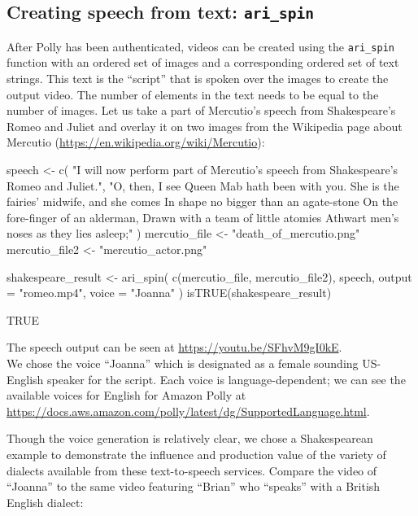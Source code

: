 \hypertarget{creating-speech-from-text-ari_spin}{%
\subsection{\texorpdfstring{Creating speech from text:
\texttt{ari\_spin}}{Creating speech from text: ari\_spin}}\label{creating-speech-from-text-ari_spin}}

After Polly has been authenticated, videos can be created using the
\texttt{ari\_spin} function with an ordered set of images and a
corresponding ordered set of text strings. This text is the ``script''
that is spoken over the images to create the output video. The number of
elements in the text needs to be equal to the number of images. Let us
take a part of Mercutio's speech from Shakespeare's Romeo and Juliet
\citep{shakespeare2003romeo} and overlay it on two images from the
Wikipedia page about Mercutio
(\url{https://en.wikipedia.org/wiki/Mercutio}):

\begin{example}
speech <- c(
  "I will now perform part of Mercutio's speech from Shakespeare's Romeo and Juliet.",
  "O, then, I see Queen Mab hath been with you.
   She is the fairies' midwife, and she comes
   In shape no bigger than an agate-stone
   On the fore-finger of an alderman,
   Drawn with a team of little atomies
   Athwart men's noses as they lies asleep;"
)
mercutio_file <- "death_of_mercutio.png"
mercutio_file2 <- "mercutio_actor.png"
\end{example}

\begin{example}
shakespeare_result <- ari_spin(
  c(mercutio_file, mercutio_file2),
  speech,
  output = "romeo.mp4", voice = "Joanna"
)
isTRUE(shakespeare_result)
\end{example}

\begin{example}
[1] TRUE
\end{example}

The speech output can be seen at \url{https://youtu.be/SFhvM9gI0kE}.\\
We chose the voice ``Joanna'' which is designated as a female sounding
US-English speaker for the script. Each voice is language-dependent; we
can see the available voices for English for Amazon Polly at
\url{https://docs.aws.amazon.com/polly/latest/dg/SupportedLanguage.html}.

Though the voice generation is relatively clear, we chose a
Shakespearean example to demonstrate the influence and production value
of the variety of dialects available from these text-to-speech services.
Compare the video of ``Joanna'' to the same video featuring ``Brian''
who ``speaks'' with a British English dialect:

